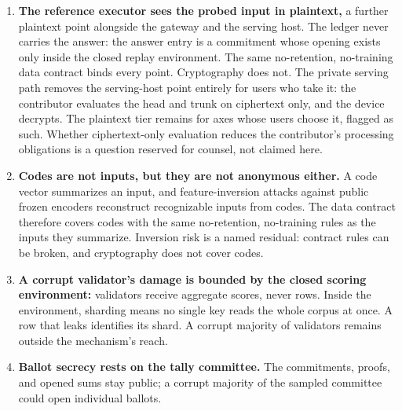 \documentclass[11pt]{article}
\begin{document}
\begin{enumerate}
          more private than the plaintext tier's, and adjudication is the
          same table: an unopened commitment or a mismatched evaluation is
          a deviation. The
          remaining residual is collusion between an executor and a
          host. It requires corrupting every sampled executor of the
          same session. That is a corrupt fraction of the
          executor pool raised to the executor count. The executors' own
          slashable promises bound it further.
    \item \textbf{The reference executor sees the probed input in plaintext,}
          a further plaintext point alongside the gateway and the
          serving host. The ledger never carries the answer: the answer
          entry is a commitment whose opening exists only inside the
          closed replay environment. The same
          no-retention, no-training data contract binds every point.
          Cryptography does not. The private serving path removes the
          serving-host point entirely for users who
          take it: the contributor evaluates the head and trunk on
          ciphertext only, and the device decrypts. The
          plaintext tier remains for axes whose users choose it, flagged as
          such. Whether ciphertext-only evaluation reduces the
          contributor's processing obligations is a question reserved for
          counsel, not claimed here.
    \item \textbf{Codes are not inputs, but they are not anonymous
              either.} A
          code vector summarizes an input, and feature-inversion attacks
          against public frozen encoders reconstruct recognizable inputs
          from codes. The data contract therefore covers codes with the
          same no-retention, no-training rules as the inputs they
          summarize. Inversion risk is a named residual: contract rules can
          be broken, and cryptography does not cover codes.
    \item \textbf{A corrupt validator's damage is bounded by the closed
              scoring environment:} validators receive aggregate scores, never
          rows. Inside the environment, sharding means no single key reads
          the whole corpus at once. A row that leaks identifies its shard.
          A corrupt majority of validators remains outside the
          mechanism's reach.
    \item \textbf{Ballot secrecy rests on the tally committee.} The
          commitments, proofs, and opened sums stay public; a corrupt
          majority of the sampled committee could open individual ballots.

\end{enumerate}
\end{document}

